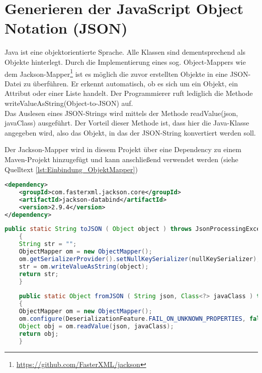 \section{Generieren der JavaScript Object Notation (JSON)}
\label{sec:json_generieren}
Java ist eine objektorientierte Sprache. Alle Klassen sind dementsprechend als Objekte hinterlegt. Durch die Implementierung eines sog. Object-Mappers wie dem Jackson-Mapper\footnote{\url{https://github.com/FasterXML/jackson}}
ist es möglich die zuvor erstellten Objekte in eine JSON-Datei zu überführen. Er erkennt automatisch, ob es sich um ein Objekt, ein Attribut oder einer Liste handelt. Der Programmierer ruft lediglich die Methode writeValueAsString(Object-to-JSON) auf. \\
Das Auslesen eines JSON-Strings wird mittels der Methode readValue(json, javaClass) ausgeführt. Der Vorteil dieser Methode ist, dass hier die Java-Klasse angegeben wird, also das Objekt, in das der JSON-String konvertiert werden soll. 

Der Jackson-Mapper wird in diesem Projekt über eine Dependency zu einem Maven-Projekt hinzugefügt und kann anschließend verwendet werden (siehe Quelltext \ref{lst:Einbindung_ObjektMapper}) %

\begin{minipage}{\linewidth}
\begin{lstlisting}[language=XML]
<dependency>
	<groupId>com.fasterxml.jackson.core</groupId>
	<artifactId>jackson-databind</artifactId>
	<version>2.9.4</version>
</dependency>
\end{lstlisting}
\label{lst:Einbindung_ObjektMapper}
\end{minipage} 

\begin{minipage}{\linewidth}
	\begin{lstlisting}[language=JAVA] 
	public static String toJSON ( Object object ) throws JsonProcessingException
	{
	String str = "";
	ObjectMapper om = new ObjectMapper();
	om.getSerializerProvider().setNullKeySerializer(nullKeySerializer);
	str = om.writeValueAsString(object);
	return str;
	}
	
	public static Object fromJSON ( String json, Class<?> javaClass ) throws IOException
	{
	ObjectMapper om = new ObjectMapper();
	om.configure(DeserializationFeature.FAIL_ON_UNKNOWN_PROPERTIES, false);
	Object obj = om.readValue(json, javaClass);
	return obj;
	}
	\end{lstlisting}
\end{minipage} 